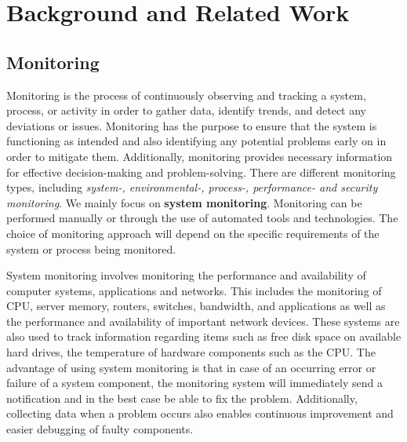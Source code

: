 \chapter{Background and Related Work}
\label{ch:background}

    \section{Monitoring}
    \label{sec:monitoring-background}

        Monitoring is the process of continuously observing and tracking a system, process, or activity in order to gather data, identify trends, and detect any deviations or issues.
        Monitoring has the purpose to ensure that the system is functioning as intended and also identifying any potential problems early on in order to mitigate them. Additionally, monitoring provides necessary information for effective decision-making and problem-solving.
        There are different monitoring types, including \emph{system-, environmental-, process-, performance- and security monitoring}.
        We mainly focus on \textbf{system monitoring}.
        Monitoring can be performed manually or through the use of automated tools and technologies.
        The choice of monitoring approach will depend on the specific requirements of the system or process being monitored.

        System monitoring involves monitoring the performance and availability of computer systems, applications and networks.
        This includes the monitoring of CPU, server memory, routers, switches, bandwidth, and applications as well as the performance and availability of important network devices. 
        These systems are also used to track information regarding items such as free disk space on available hard drives, the temperature of hardware components such as the CPU.
        The advantage of using system monitoring is that in case of an occurring error or failure of a system component, the monitoring system will immediately send a notification and in the best case be able to fix the problem.
        Additionally, collecting data when a problem occurs also enables continuous improvement and easier debugging of faulty components.





